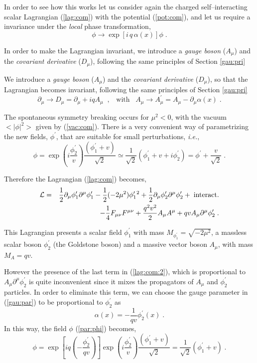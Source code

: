 \documentclass[12pt]{report}
\newcommand{\lag}{{\cal L}}
\newcommand{\del}{\partial}
\begin{document}
In order to see how this works let us consider again the charged
self--inter\-act\-ing scalar Lagrangian (\ref{lag:com}) with the
potential (\ref{pot:com}), and let us require a invariance under
the {\it local} phase transformation,
\begin{equation}
\phi \to \exp\left[i \, q \, \alpha (x)\right] \phi \; .
\label{gau:par}
\end{equation}

In order to make the Lagrangian invariant, we introduce a {\it  gauge
boson} ($A_\mu$) and the {\it covariant derivative} ($D_\mu$),
following the same principles of Section \ref{gau:pri}

We introduce a {\it  gauge boson} ($A_\mu$) and the {\it covariant
derivative} ($D_\mu$), so that the Lagrangian becomes invariant,
following the same principles of Section \ref{gau:pri}
\[
\del_\mu \longrightarrow D_\mu = \del_\mu + i q A_\mu 
\;\; , \;\;\; \mbox{with} \;\;\;
A_\mu \longrightarrow A_\mu^\prime = A_\mu - \del_\mu \alpha(x) \; .
\]

The spontaneous symmetry breaking occurs for $\mu^2 < 0$, with the
vacuum  $<|\phi|^2>$ given by (\ref{vac:com}). There is a very
convenient way of parametrizing the new fields, $\phi^\prime$, that
are suitable  for small perturbations, {\it i.e.},
\begin{equation}
\phi = \exp\left(i \frac{\phi_2^\prime}{v} \right) 
        \frac{(\phi_1^\prime + v)}{\sqrt{2}} 
 \simeq  \frac{1}{\sqrt{2}} 
\left( \phi_1^\prime + v + i \phi_2^\prime \right) 
= \phi^\prime + \frac{v}{\sqrt{2}} \; .
\label{par:phi}
\end{equation}

Therefore the Lagrangian (\ref{lag:com}) becomes,
\begin{eqnarray}
\lag & = & { \frac{1}{2} \del_\mu \phi_1^\prime \del^\mu \phi_1^\prime - 
\frac{1}{2} (-2 \mu^2) \phi_1^{\prime \; 2} } + 
\frac{1}{2} \del_\mu \phi_2^\prime \del^\mu \phi_2^\prime + \;
{\mbox{interact.}}
\nonumber \\
&& { - \frac{1}{4} F_{\mu\nu} F^{\mu\nu} + 
\frac{q^2 v^2}{2} A_\mu A^\mu } + { q v A_\mu \del^\mu \phi_2^\prime }
\; .
\label{lag:com:2}
\end{eqnarray}

This Lagrangian presents a scalar field $\phi_1^\prime$ with mass
$M_{\phi_1^\prime} = \sqrt{-2 \mu^2}$, a  massless scalar boson
$\phi_2^\prime$ (the Goldstone boson) and a massive vector boson
$A_\mu$, with mass $M_{A} = q v$. 

However the presence of the last term in (\ref{lag:com:2}), which is
proportional to $A_\mu \del^\mu \phi_2^\prime$ is quite inconvenient
since it mixes the propagators of $A_\mu$ and $\phi_2^\prime$
particles. In order to eliminate this term,  we can choose the gauge
parameter in (\ref{gau:par}) to be proportional to $\phi_2^\prime$
as
\[
\alpha (x) = - \frac{1}{qv} \phi_2^\prime (x) \; .
\]
In this way, the field $\phi$ (\ref{par:phi}) becomes,
\[
\phi = { \exp\left[i q \left( - \frac{\phi_2^\prime }{qv} \right)\right]} 
               \exp\left(i \frac{\phi_2^\prime}{v} \right) 
        \frac{(\phi_1^\prime + v)}{\sqrt{2}}  
= \frac{1}{\sqrt{2}}  \left( \phi_1^\prime + v  \right) \; .
\]
\end{document}
